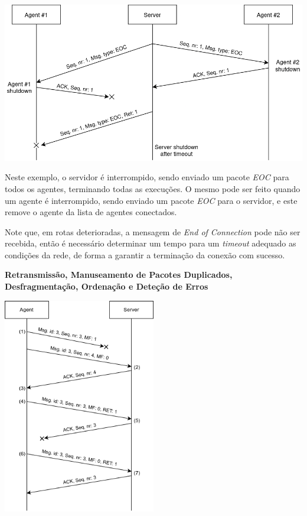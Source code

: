 \documentclass[a4paper,12pt]{scrreprt}
\begin{document}
\begin{minipage}{\textwidth}
    \centering
    \includegraphics[width=\textwidth]{img/sequence_diagrams/end_of_connection.png}
    \label{fig:nt_end_of_connection}
\end{minipage}

Neste exemplo, o servidor é interrompido, sendo enviado um pacote \textit{EOC} para
todos os agentes, terminando todas as execuções. O mesmo pode ser feito quando um agente
é interrompido, sendo enviado um pacote \textit{EOC} para o servidor, e este remove
o agente da lista de agentes conectados.

Note que, em rotas deterioradas, a mensagem de \textit{End of Connection} pode não ser recebida,
então é necessário determinar um tempo para um \textit{timeout} adequado as condições da rede,
de forma a garantir a terminação da conexão com sucesso.

\textbf{Retransmissão, Manuseamento de Pacotes Duplicados, Desfragmentação, Ordenação e Deteção de Erros}

\begin{minipage}{\textwidth}
    \centering
    \includegraphics[width=0.5\textwidth]{img/sequence_diagrams/ret_dup_frag_ord_error.png}
    \label{fig:nt_ret_dup_frag_ord_error}
\end{minipage}
\end{document}
